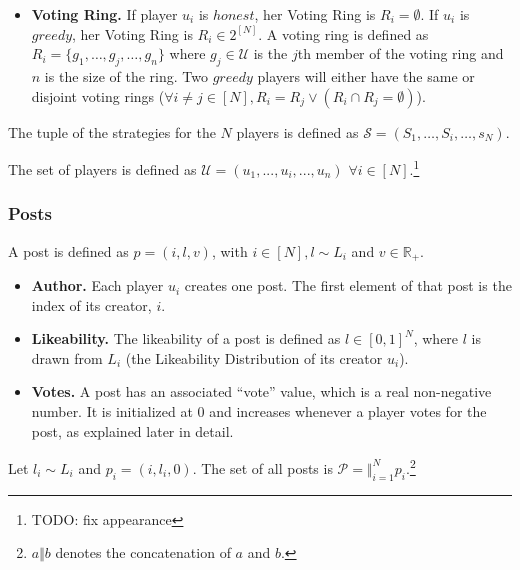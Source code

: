 \begin{itemize}
\begin{itemize}
          \item \textbf{Voting Ring.}  If player $u_i$ is $honest$, her Voting
          Ring is $R_i = \emptyset$. If $u_i$ is $greedy$, her Voting Ring is $R_i
          \in 2^{\left[N\right]}$. A voting ring is defined as $R_i = \lbrace
          g_1, \dots, g_j, \dots, g_n \rbrace$ where $g_j \in \mathcal{U}$ is the
          $j$th member of the voting ring and $n$ is the size of the ring. Two
          $greedy$ players will either have the same or disjoint voting rings
          ($\forall i \neq j \in \left[N\right], R_i = R_j \vee \left(R_i \cap
          R_j = \emptyset\right)$).
        \end{itemize}
        The tuple of the strategies for the $N$ players is defined as
        $\mathcal{S} = (S_1, \dots, S_i, \dots, s_N)$.
      \end{itemize}
      The set of players is defined as $\mathcal{U} = ( u_1,..., u_i,..., u_n )$
      $\forall i \in \left[N\right]$.\footnote{TODO: fix appearance}

    \subsubsection*{Posts}
      A post is defined as $p = \left(i, l, v\right)$, with $i \in
      \left[N\right], l \sim L_i$ and $v \in \mathbb{R}_{+}$.
      \begin{itemize}
        \item \textbf{Author.} Each player $u_i$ creates one post. The first
        element of that post is the index of its creator, $i$.

        \item \textbf{Likeability.} The likeability of a post is defined as $l
        \in \left[0, 1\right]^N$, where $l$ is drawn from $L_i$ (the Likeability
        Distribution of its creator $u_i$).

        \item \textbf{Votes.} A post has an associated ``vote'' value, which is a
        real non-negative number. It is initialized at 0 and increases whenever a
        player votes for the post, as explained later in detail.
      \end{itemize}
      Let $l_i \sim L_i$ and $p_i = \left(i, l_i, 0\right)$. The set of all posts
      is $\mathcal{P} = \Vert_{i=1}^N p_i$.\footnote{$a \Vert b$ denotes the
      concatenation of $a$ and $b$.}



